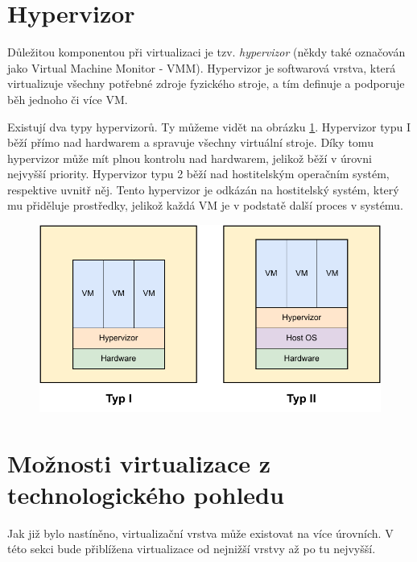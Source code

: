 \section{Hypervizor}

Důležitou komponentou při virtualizaci je tzv. \textit{hypervizor} (někdy také označován jako Virtual Machine Monitor - VMM). Hypervizor je softwarová vrstva, která virtualizuje všechny potřebné zdroje fyzického stroje, a tím definuje a podporuje běh jednoho či více VM.\,\cite{whitaker2002denali}

Existují dva typy hypervizorů. Ty můžeme vidět na obrázku \ref{fig:vm_types}. Hypervizor typu I běží přímo nad hardwarem a spravuje všechny virtuální stroje. Díky tomu hypervizor může mít plnou kontrolu nad hardwarem, jelikož běží v úrovni nejvyšší priority. Hypervizor typu 2 běží nad hostitelským operačním systém, respektive uvnitř něj. Tento hypervizor je odkázán na hostitelský systém, který mu přiděluje prostředky, jelikož každá VM je v podstatě další proces v systému.\,\cite{chiueh2005survey}\cite{RODRIGUEZHARO2012267}

\begin{figure}[htbp]
    \centering 
    \includegraphics[width=\textwidth]{assets/img/vm_types.pdf}
    \label{fig:vm_types}
\end{figure}

\section{Možnosti virtualizace z technologického pohledu}

Jak již bylo nastíněno, virtualizační vrstva může existovat na více úrovních. V této sekci bude přiblížena virtualizace od nejnižší vrstvy až po tu nejvyšší.

